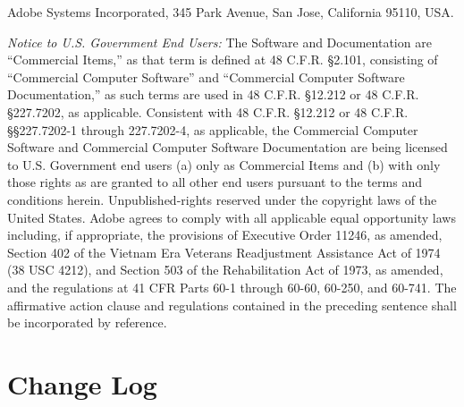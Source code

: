 \makeatletter{}\documentclass[10pt,oneside]{book}
\theoremstyle{note}
\begin{document}
Adobe Systems Incorporated, 345 Park Avenue, San Jose, California 95110, USA.

\emph{Notice to U.S. Government End Users:} The Software and Documentation are ``Commercial Items,'' as
that term is defined at 48 C.F.R. \S2.101, consisting of ``Commercial Computer Software'' and
``Commercial Computer Software Documentation,'' as such terms are used in 48 C.F.R. \S12.212
or 48 C.F.R. \S227.7202, as applicable. Consistent with 48 C.F.R. \S12.212 or 48 C.F.R.
\S\S227.7202-1 through 227.7202-4, as applicable, the Commercial Computer Software and
Commercial Computer Software Documentation are being licensed to U.S. Government end users (a) only
as Commercial Items and (b) with only those rights as are granted to all other end users pursuant
to the terms and conditions herein. Unpublished-rights reserved under the copyright laws of the
United States. Adobe agrees to comply with all applicable equal opportunity laws including, if
appropriate, the provisions of Executive Order 11246, as amended, Section 402 of the Vietnam Era
Veterans Readjustment Assistance Act of 1974 (38 USC 4212), and Section 503 of the Rehabilitation
Act of 1973, as amended, and the regulations at 41 CFR Parts 60-1 through 60-60, 60-250, and 60-741.
The affirmative action clause and regulations contained in the preceding sentence shall be
incorporated by reference.


\pagebreak

\section*{Change Log}
\end{document}
